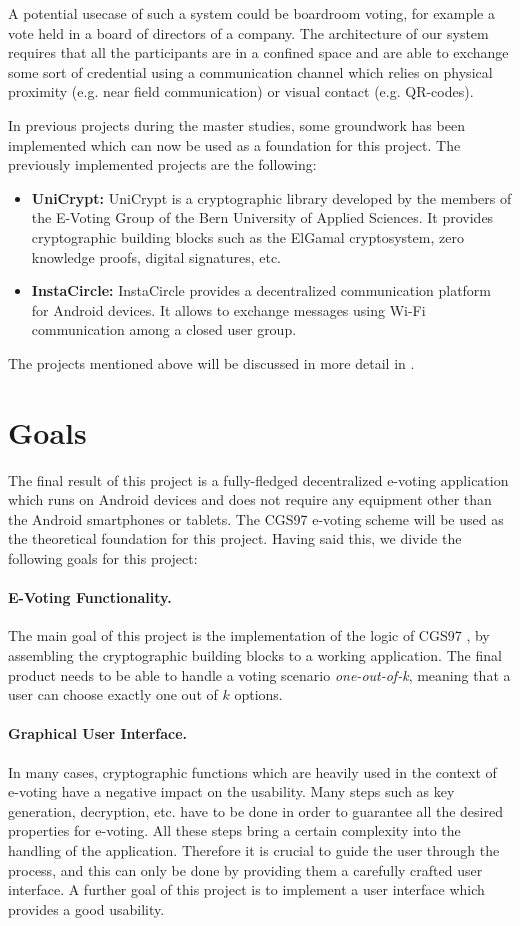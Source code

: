\documentclass[numbers=noenddot, abstract=on, a4paper, headsepline,
footsepline, oneside, draft=off]{scrreprt}
\begin{document}
A potential usecase of such a system could be boardroom voting, for example a
vote held in a board of directors of a company. The architecture of our system
requires that all the participants are in a confined space and are able to
exchange some sort of credential using a communication channel which relies on
physical proximity (e.g. near field communication) or visual contact (e.g.
QR-codes).

In previous projects during the master studies, some groundwork has been
implemented which can now be used as a foundation for this project. The
previously implemented projects are the following:
\begin{itemize}
  \item \textbf{UniCrypt:} UniCrypt is a cryptographic library developed by the
  members of the E-Voting Group of the Bern University of Applied Sciences. It
  provides cryptographic building blocks such as the ElGamal cryptosystem, zero
  knowledge proofs, digital signatures, etc. 
  \item \textbf{InstaCircle: } InstaCircle provides a decentralized
  communication platform for Android devices. It allows to exchange messages
  using Wi-Fi communication among a closed user group.
\end{itemize}
The projects mentioned above will be discussed in more detail in .

\section{Goals}
\label{cha:goals}
The final result of this project is a fully-fledged decentralized e-voting
application which runs on Android devices and does not require any equipment
other than the Android smartphones or tablets. The CGS97 e-voting
scheme \cite{CGS97} will be used as the theoretical foundation for this project.
Having said this, we divide the following goals for this project:
\paragraph{E-Voting Functionality.}
The main goal of this project is the implementation of the logic of CGS97
\cite{CGS97}, by assembling the cryptographic building blocks to a working
application. The final product needs to be able to handle a
voting scenario \emph{one-out-of-k}, meaning that a user can choose exactly one
out of $k$ options. 

\paragraph{Graphical User Interface.}
In many cases, cryptographic functions which are heavily used in the context of
e-voting have a negative impact on the usability. Many steps such as key
generation, decryption, etc. have to be done in order to guarantee all the
desired properties for e-voting. All these steps bring a certain complexity
into the handling of the application. Therefore it is crucial to guide the user
through the process, and this can only be done by providing them a carefully
crafted user interface. A further goal of this project is to implement a user
interface which provides a good usability.
\end{document}

